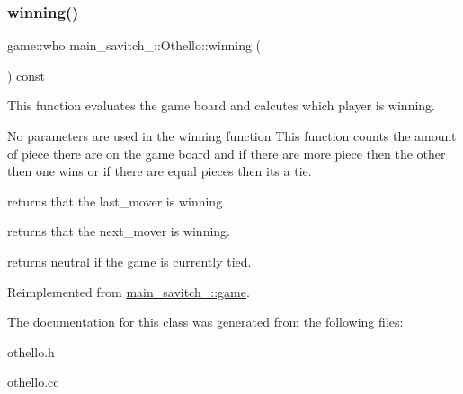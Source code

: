 \subsubsection{\texorpdfstring{winning()}{winning()}}
{\footnotesize\ttfamily game\+::who main\+\_\+savitch\+\_\+::\+Othello\+::winning (\begin{DoxyParamCaption}{ }\end{DoxyParamCaption}) const\hspace{0.3cm}{\ttfamily [virtual]}}



This function evaluates the game board and calcutes which player is winning. 

No parameters are used in the winning function This function counts the amount of piece there are on the game board and if there are more piece then the other then one wins or if there are equal pieces then its a tie.

returns that the last\+\_\+mover is winning

returns that the next\+\_\+mover is winning.

returns neutral if the game is currently tied. 

Reimplemented from \mbox{\hyperlink{classmain__savitch__14_1_1game_a2f0d5338c12bd98d52fe2383ece5c45e}{main\+\_\+savitch\+\_\+::game}}.



The documentation for this class was generated from the following files\+:\begin{DoxyCompactItemize}
\item 
othello.\+h\item 
othello.\+cc\end{DoxyCompactItemize}
